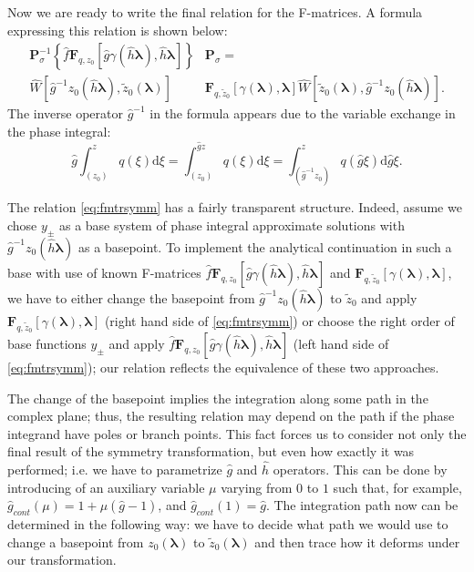 \documentclass[atmp]{ipart_v1}
\def\rmd{\mathrm{d}}
\def\lmbd{\bm{\lambda}}
\def\F{\bm{F}}
\def\f{\hat{f}}
\def\g{\hat{g}}
\def\h{\hat{h}}
\def\P{\bm{P}_\sigma}
\def\W{\widehat{W}}
\def\unity{1}
\newcommand\eref[1]{\eqref{#1}}
\begin{document}
Now we are ready to write the final relation for the F-matrices. A formula
expressing this relation is shown below:
\begin{equation}
\begin{split}
\P^{-1} \left\{ \f \F_{q,z_0} \left[\g \gamma(\h \lmbd), \h \lmbd \right] \right\} &\P=
 \\
   \W \left[ \g^{-1} z_0(\h\lmbd), \tilde{z}_0(\lmbd) \right]&
   \F_{q,\tilde{z}_0} \left[ \gamma(\lmbd), \lmbd \right]
   \W \left[ \tilde{z}_0(\lmbd), \g^{-1} z_0(\h\lmbd) \right].
\end{split}
\label{eq:fmtrsymm}
\end{equation}
The inverse operator $\g^{-1}$ in the formula appears due to the variable exchange in the phase integral:
\begin{equation}
\g \int_{(z_0)}^z q(\xi) \rmd \xi = \int_{(z_0)}^{\g z} q(\xi) \rmd \xi 
= \int_{(\g^{-1}z_0)}^{z} q(\g\xi) \rmd \g\xi.
\end{equation}

The relation \eref{eq:fmtrsymm} has a fairly transparent structure. Indeed, assume we chose $y_\pm$ 
as a base system of phase integral approximate solutions with $\g^{-1} z_0(\h\lmbd)$ as a basepoint. 
To implement the analytical continuation in such a base with use of known F-matrices 
$\f\F_{q,z_0}[\g\gamma(\h\lmbd),\h\lmbd]$ and $\F_{q,\tilde{z}_0}[\gamma(\lmbd),\lmbd]$, 
we have to either change the basepoint from $\g^{-1} z_0(\h\lmbd)$ to $\tilde{z}_0$ and apply
$\F_{q,\tilde{z}_0}[\gamma(\lmbd),\lmbd]$ (right hand side of \eref{eq:fmtrsymm}) 
or choose the right order of base functions $y_\pm$ and apply $\f\F_{q,z_0}[\g\gamma(\h\lmbd),\h\lmbd]$
(left hand side of \eref{eq:fmtrsymm}); our relation reflects the equivalence of these two approaches.

The change of the basepoint implies the integration along some path in the complex plane;
thus, the resulting relation may depend on the path if the phase integrand have poles
or branch points. This fact forces us to consider not only the final result of the 
symmetry transformation, but even how exactly it was performed; i.e. we have to parametrize
$\g$ and $\h$ operators. This can be done by introducing of an auxiliary variable $\mu$ varying 
from $0$ to $1$ such that, for example, $\g_{cont}(\mu)=\unity+\mu (\g-\unity)$, and $\g_{cont}(1)=\g$. 
The integration path now can be determined in the following way: we have to decide what path 
we would use to change a basepoint from $z_0(\lmbd)$ to $\tilde{z}_0(\lmbd)$ and then trace how 
it deforms under our transformation. 
\end{document}
